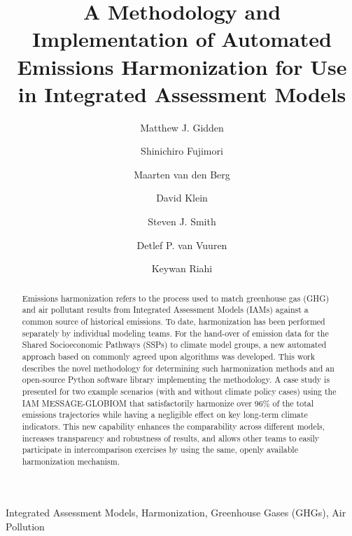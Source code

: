 \documentclass[review]{elsarticle}
\begin{document}
\begin{frontmatter}

\title{A Methodology and Implementation of Automated Emissions Harmonization for Use in Integrated Assessment Models}

\author[iiasa]{Matthew J. Gidden}

\author[nies]{Shinichiro Fujimori}
\author[pbl]{Maarten van den Berg}
\author[pik]{David Klein}
\author[pnnl]{Steven J. Smith}
\author[pbl]{Detlef P. van Vuuren}
\author[iiasa]{Keywan Riahi}

\address[iiasa]{International Institute for Applied Systems Analysis,
  Schlossplatz 1, A-2361 Laxenburg, Austria}
\address[nies]{Center for Social and Environmental Systems Research, National Institute for Environmental Studies, 16-2 Onogawa, Tsukuba, Ibaraki 305-8506, Japan}
\address[pbl]{PBL Netherlands Environmental Assessment Agency, Postbus 30314, 2500 GH The Hague, Netherlands}
\address[pik]{Potsdam Institute for Climate Impact Research (PIK), Member of the Leibniz Association, P.O. Box 60 12 03, D-14412 Potsdam, Germany}
\address[pnnl]{Joint Global Change Research Institute, 5825 University Research Court, Suite 3500, College Park, MD 20740}

\begin{abstract}
Emissions harmonization refers to the process used to match greenhouse gas (GHG)
and air pollutant results from Integrated Assessment Models (IAMs) against a
common source of historical emissions. To date, harmonization has been performed
separately by individual modeling teams. For the hand-over of emission data for
the Shared Socioeconomic Pathways (SSPs) to climate model groups, a new
automated approach based on commonly agreed upon algorithms was developed. This
work describes the novel methodology for determining such harmonization methods
and an open-source Python software library implementing the methodology. A case
study is presented for two example scenarios (with and without climate policy
cases) using the IAM MESSAGE-GLOBIOM that satisfactorily harmonize over 96\% of
the total emissions trajectories while having a negligible effect on key
long-term climate indicators. This new capability enhances the comparability
across different models, increases transparency and robustness of results, and
allows other teams to easily participate in intercomparison exercises by using
the same, openly available harmonization mechanism.
\end{abstract}

\begin{keyword}
Integrated Assessment Models, Harmonization, Greenhouse Gases (GHGs), Air Pollution 
\end{keyword}

\end{frontmatter}
\end{document}
